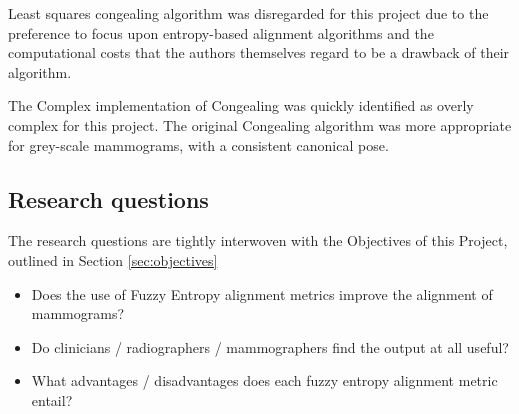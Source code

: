 Least squares congealing algorithm was disregarded for this project due to the preference to focus upon entropy-based alignment algorithms and the computational costs that the authors themselves regard to be a drawback of their algorithm.

The Complex implementation of Congealing was quickly identified as overly complex for this project. The original Congealing algorithm was more appropriate for grey-scale mammograms, with a consistent canonical pose.

\subsection{Research questions}

The research questions are tightly interwoven with the Objectives of this Project, outlined in Section \ref{sec:objectives}

\begin{itemize}
  \item Does the use of Fuzzy Entropy alignment metrics improve the alignment of mammograms?
  \item Do clinicians / radiographers / mammographers find the output at all useful?
  \item What advantages / disadvantages does each fuzzy entropy alignment metric entail?
\end{itemize}

